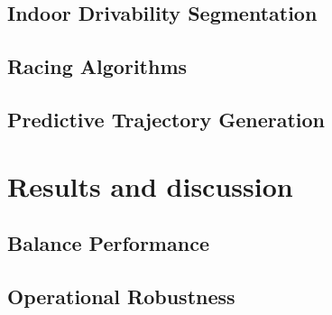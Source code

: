         \subsection{Indoor Drivability Segmentation}

        \subsection{Racing Algorithms}

        \subsection{Predictive Trajectory Generation}
    
    \pagebreak{}


  \section{Results and discussion} %
    \subsection{Balance Performance}

    \subsection{Operational Robustness}
